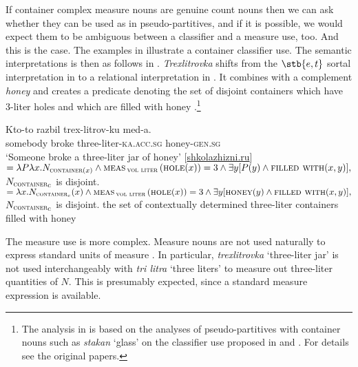 \documentclass[output=paper]{langscibook}
\begin{document}
\noindent If container complex measure nouns are genuine count nouns then we can ask whether they can be used as in pseudo-partitives, and if it is possible, we would expect them to be ambiguous between a classifier and a measure use, too. And this is the case. The examples in  illustrate a container classifier use. The semantic interpretations is then as follows in . \textit{Trexlitrovka} shifts from the $\stb{e,t}$ sortal interpretation in  to a relational interpretation in . It combines with a complement \textit{honey} and creates a predicate denoting the set of disjoint containers which have 3-liter holes and which are filled with honey .\footnote{The analysis in  is based on the analyses of  pseudo-partitives with container nouns such as \textit{stakan} `glass' on the classifier use proposed in \citet{Partee.Borschev2012} and \citet{Khrizman2016,Khrizman2016b}. For details see the original papers.}

\ea\label{ex:khrizmann:29}
    \ea\label{ex:khrizmann:29a} \gll Kto-to razbil trex-litrov-ku med-a.\\
    somebody broke three-liter-\textsc{ka.acc.sg} honey-\textsc{gen.sg}\\
    \glt `Someone broke a three-liter jar of honey' \hfill [\href{http://shkolazhizni.ru/psychology/articles/57018/}{shkolazhizni.ru}]
\z\ex\label{ex:khrizmann:30}
    \ea\label{ex:khrizmann:30a}  $= \lambda P \lambda x.N_{\textsc{container}(x)} \wedge \textsc{meas}\,_{\textsc{vol liter}}\,(\textsc{hole}(x)) = 3 \wedge \exists y [P(y) \wedge \textsc{filled with}(x,y)],$
    {$N_{\textsc{container}\textsubscript{c}}$ is disjoint.}
    \ex\label{ex:khrizmann:30b}  $= \lambda x.N_{\textsc{container}_{c}}(x) \wedge \textsc{meas}\,_{\textsc{vol liter}}\,(\textsc{hole}(x)) = 3 \wedge \exists y [\textsc{honey}(y) \wedge \textsc{filled with}(x,y)],$
    {$N_{\textsc{container}\textsubscript{c}}$ is disjoint.}
    \z
{the set of contextually determined three-liter containers filled with honey}
\z

\noindent The measure use is more complex. Measure nouns are not used naturally to express standard units of measure . In particular, \textit{trexlitrovka} `three-liter jar' is not used interchangeably with \textit{tri litra} `three liters' to measure out three-liter quantities of $N$. This is presumably expected, since a standard measure expression is available.
\end{document}
